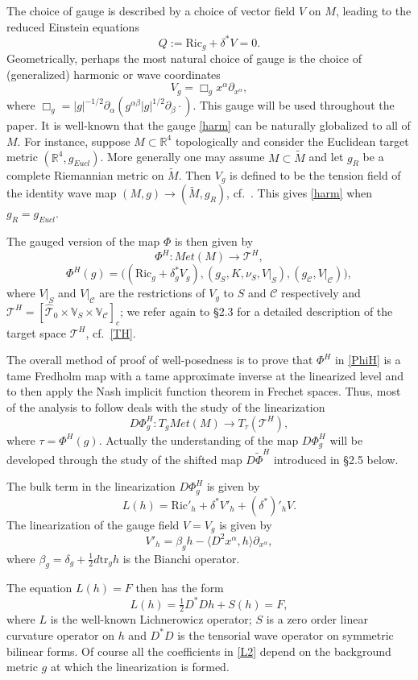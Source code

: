\documentclass[10pt]{amsart}
\renewcommand{\a}{\alpha}
\renewcommand{\b}{\beta}
\renewcommand{\d}{\delta}
\newcommand{\cC}{{\mathcal C}}
\newcommand{\cT}{{\mathcal T}}
\newcommand{\bR}{\mathbb R}
\newcommand{\bV}{\mathbb V}
\newcommand{\Ric}{\mathrm{Ric}}
\newcommand{\be}{\begin{equation}}
\newcommand{\ee}{\end{equation}}
\newcommand{\tr}{\mathrm{tr}}
\newcommand{\p}{\partial}
\renewcommand{\to}{\rightarrow}
\renewcommand{\hat}{\widehat}
\newcommand{\<}{\langle}
\renewcommand{\>}{\rangle}
\newcommand{\w}{\widetilde}
\theoremstyle{plain}
\theoremstyle{remark}
\theoremstyle{definition}
\numberwithin{equation}{section}
\begin{document}
The choice of gauge is described by a choice of vector field $V$ on $M$, leading to the reduced Einstein equations 
\be \label{Q}
Q := \Ric_g + \d^*V = 0.
\ee
Geometrically, perhaps the most natural choice of gauge is the choice of (generalized) harmonic or wave coordinates 
\be \label{harm}
V_g = \Box_g x^{\a}\p_{x^{\a}},
\ee
where $\Box_g = |g|^{-1/2}\p_{\a}(g^{\a\b}|g|^{1/2}\p_{\b} \cdot)$. This gauge will be used throughout the paper. It is well-known that the gauge \eqref{harm} can be 
naturally globalized to all of $M$. For instance, suppose $M \subset \bR^4$ topologically and consider the Euclidean target metric $(\bR^4, g_{Eucl})$. More 
generally one may assume $M \subset \w M$ and let $g_R$ be a complete Riemannian metric on $\w M$. Then $V_g$ is defined to be the tension field of 
the identity wave map $(M, g) \to (\w M, g_R)$, cf.~\cite{GG}. This gives \eqref{harm} when $g_R = g_{Eucl}$. 

  The gauged version of the map $\Phi$ is then given by 
\be \label{PhiH}
 \Phi^H: Met(M) \to \cT^H,
 \ee
$$\Phi^H(g) = \big((\Ric_g + \d_g^* V_g), (g_S, K, \nu_S, V|_S), (g_{\cC}, V|_{\cC}) \big),$$ 
where $V|_S$ and $V|_{\cC}$ are the restrictions of $V_g$ to $S$ and $\cC$ respectively and $\cT^H = [\hat \cT_0 \times \bV_S \times \bV_{\cC}]_c$; we 
refer again to \S 2.3 for a detailed description of the target space $\cT^H$, cf.~\eqref{TH}.   

  The overall method of proof of well-posedness is to prove that $\Phi^H$ in \eqref{PhiH} is a tame Fredholm map with a tame approximate inverse at the 
linearized level and to then apply the Nash implicit function theorem in Frechet spaces. Thus, most of the analysis to follow deals with the study of the linearization 
\be \label{DF2}
D\Phi_g^H: T_g Met(M) \to T_{\tau}(\cT^H),
\ee
where $\tau = \Phi^H(g)$. Actually the understanding of the map $D\Phi_g^H$ will be developed through the study of the shifted map $D\w \Phi^H$ introduced in 
\S 2.5 below. 

\medskip 

  The bulk term in the linearization $D \Phi_g^H$ is given by 
 \be \label{L}
L(h) = \Ric'_h + \d^*V'_h + (\d^*)'_hV.
\ee
The linearization of the gauge field $V = V_g$ is given by 
\be \label{V'}
V'_h = \b_g h - \<D^2 x^{\a}, h\>\p_{x^{\a}},
\ee
where $\b_g = \d_g + \frac{1}{2}d\tr_g h$ is the Bianchi operator. 

The equation $L(h) = F$ then has the form 
\be \label{L2}
L(h) = \tfrac{1}{2}D^*D h + S(h) = F,
\ee
where $L$ is the well-known Lichnerowicz operator; $S$ is a zero order linear curvature operator on $h$ and $D^*D$ is the tensorial wave operator on symmetric 
bilinear forms. Of course all the coefficients in \eqref{L2} depend on the background metric $g$ at which the linearization is formed. 
 
\end{document}
